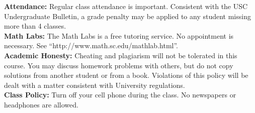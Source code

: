 \documentclass[11pt]{amsart}
\begin{document}
{\bf Attendance:} Regular class attendance is important. Consistent with the USC Undergraduate Bulletin, a grade penalty may be applied to
any student missing more than 4 classes.\\[0.3cm]
{\bf Math Labs:} The Math Labs is a free tutoring service. No appointment is necessary. See ``http://www.math.sc.edu/mathlab.html''.\\[0.3cm]
{\bf Academic Honesty:} Cheating and plagiarism will not be tolerated in this course. You may discuss homework problems with others, but do
not copy solutions from another student or from a book. Violations of this policy will be dealt with a matter consistent with University
regulations.\\[0.3cm]
{\bf Class Policy:} Turn off your cell phone during the class. No newspapers or headphones are allowed.
\end{document}

